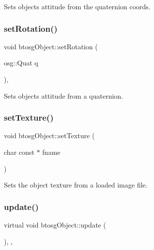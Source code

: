 Sets objects attitude from the quaternion coords. \mbox{\label{classbtosgObject_ae803e0566f0d7b3ffca686b968b297f8}} 
\subsubsection{\texorpdfstring{set\+Rotation()}{setRotation()}\hspace{0.1cm}{\footnotesize\ttfamily [3/3]}}
{\footnotesize\ttfamily void btosg\+Object\+::set\+Rotation (\begin{DoxyParamCaption}\item[{osg\+::\+Quat}]{q }\end{DoxyParamCaption})\hspace{0.3cm}{\ttfamily [inline]}, {\ttfamily [inherited]}}

Sets objects attitude from a quaternion. \mbox{\label{classbtosgObject_aff54acbc7c66811efb0cf2838107a241}} 
\subsubsection{\texorpdfstring{set\+Texture()}{setTexture()}}
{\footnotesize\ttfamily void btosg\+Object\+::set\+Texture (\begin{DoxyParamCaption}\item[{char const $\ast$}]{fname }\end{DoxyParamCaption})\hspace{0.3cm}{\ttfamily [inherited]}}

Sets the object texture from a loaded image file. \mbox{\label{classbtosgObject_a342917817dfde62554f83da8e0d5110b}} 
\subsubsection{\texorpdfstring{update()}{update()}}
{\footnotesize\ttfamily virtual void btosg\+Object\+::update (\begin{DoxyParamCaption}{ }\end{DoxyParamCaption})\hspace{0.3cm}{\ttfamily [inline]}, {\ttfamily [virtual]}, {\ttfamily [inherited]}}


